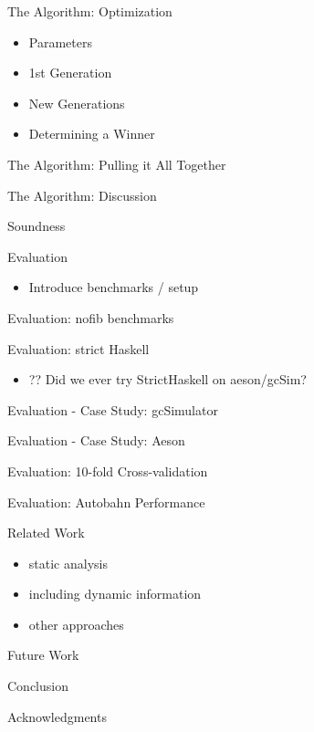 \documentclass{beamer}
\begin{document}
\begin{frame}{The Algorithm: Optimization}
  \begin{itemize}
  \item Parameters
  \item 1st Generation
  \item New Generations
  \item Determining a Winner
  \end{itemize}
\end{frame}

\begin{frame}{The Algorithm: Pulling it All Together}
\end{frame}

\begin{frame}{The Algorithm: Discussion}
\end{frame}

\begin{frame}{Soundness}
\end{frame}

\begin{frame}{Evaluation}
  \begin{itemize}
  \item Introduce benchmarks / setup
  \end{itemize}
\end{frame}

\begin{frame}{Evaluation: nofib benchmarks}
\end{frame}

\begin{frame}{Evaluation: strict Haskell}
  \begin{itemize}
  \item ?? Did we ever try StrictHaskell on aeson/gcSim?
  \end{itemize}
\end{frame}

\begin{frame}{Evaluation - Case Study: gcSimulator}
\end{frame}

\begin{frame}{Evaluation - Case Study: Aeson}
\end{frame}

\begin{frame}{Evaluation: 10-fold Cross-validation}
\end{frame}

\begin{frame}{Evaluation: Autobahn Performance}
\end{frame}

\begin{frame}{Related Work}
  \begin{itemize}
  \item static analysis
  \item including dynamic information
  \item other approaches
  \end{itemize}
\end{frame}

\begin{frame}{Future Work}
\end{frame}

\begin{frame}{Conclusion}
\end{frame}

\begin{frame}{Acknowledgments}
\end{frame}
\end{document}
